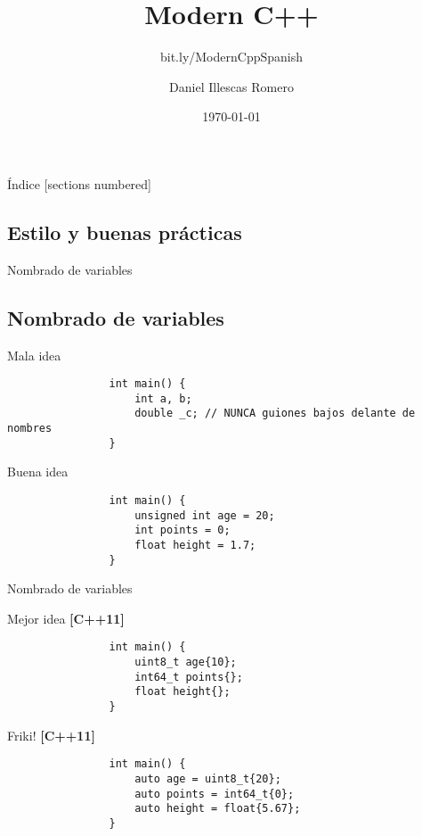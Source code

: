 \documentclass{beamer}
\title{Modern C++}
\subtitle{\small{bit.ly/ModernCppSpanish}}
\author{Daniel Illescas Romero}
\date{\today}
\institute{Universidad de Granada [UGR]}
\newcommand{\normalSizeItem}[1] {
  \normalsize{\item #1}
}
\newcommand{\newFrameWithoutIndex}[1]{
	\begin{frame}
		#1
		\thispagestyle{empty}
	\end{frame}
}
\newcommand{\newSectionWithoutIndex}[1]{
	\newFrameWithoutIndex{\section{#1}}
}
\begin{document}
	\newFrameWithoutIndex{\maketitle}
	
	\begin{frame}{Índice}		
		[sections numbered]
		\tableofcontents
	\end{frame}

	\newSectionWithoutIndex{Estilo y buenas prácticas}
  
		\begin{frame}[fragile]{Nombrado de variables}	
			\subsection{Nombrado de variables}
			\begin{itemize}
			
				\normalSizeItem {Mala idea}
				\begin{lstlisting}
				int main() {
					int a, b;
					double _c; // NUNCA guiones bajos delante de nombres
				}
				\end{lstlisting}
				
				\normalSizeItem {Buena idea}
				\begin{lstlisting}
				int main() {
					unsigned int age = 20;
					int points = 0;
					float height = 1.7;
				}
				\end{lstlisting}
				
			\end{itemize}
		\end{frame}
			 
		\begin{frame}[fragile]{Nombrado de variables}	
			\begin{itemize}
			
				\normalSizeItem{Mejor idea \textbf{[C++11]}}
				\begin{lstlisting}
				int main() {
					uint8_t age{10};
					int64_t points{}; 
					float height{};
				}
				\end{lstlisting}
				
				\normalSizeItem{Friki! \textbf{[C++11]}}
				\begin{lstlisting}
				int main() {
					auto age = uint8_t{20};
					auto points = int64_t{0};
					auto height = float{5.67};
				}
				\end{lstlisting}
				
			\end{itemize}
		\end{frame}
		
\end{document}

